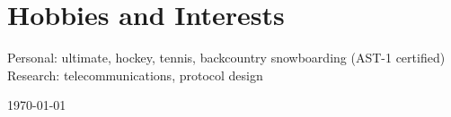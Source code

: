 \documentclass[letterpaper]{article}
\newcommand{\itemdescription}[3]{
  \textbf{#1}, {#2} \hfill \emph{#3}\\
  \medskip
}
\begin{document}













\section*{Hobbies and Interests}
Personal: ultimate, hockey, tennis, backcountry snowboarding (AST-1 certified)
\\
Research: telecommunications, protocol design

\vfill \hfill \monthyeardate\today
\end{document}
